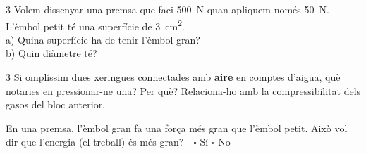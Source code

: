 \begin{exercici}{3}
Volem dissenyar una premsa que faci \SI{500}{\newton} quan apliquem només \SI{50}{\newton}. L'èmbol petit té una superfície de \SI{3}{\centi\meter\squared}.\\
a) Quina superfície ha de tenir l'èmbol gran?\\
b) Quin diàmetre té?
\end{exercici}

\begin{exercici}{3}
Si omplíssim dues xeringues connectades amb \textbf{aire} en comptes d'aigua, què notaries en pressionar-ne una? Per què? Relaciona-ho amb la compressibilitat dels gasos del bloc anterior.
\end{exercici}

\begin{comprova}
En una premsa, l'èmbol gran fa una força més gran que l'èmbol petit. Això vol dir que l'energia (el treball) és més gran?\ \ $\square$ Sí \quad $\square$ No
\end{comprova}
